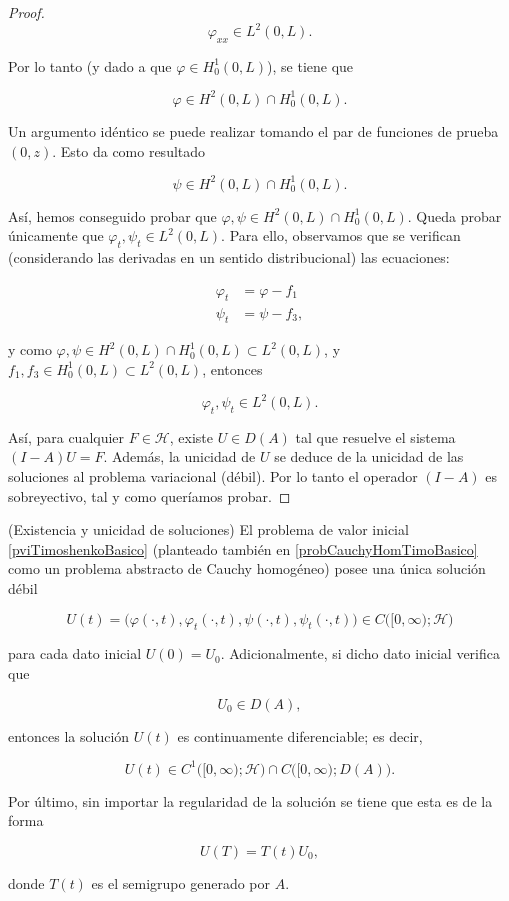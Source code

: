 \begin{proof}
    \[\varphi_{xx} \in L^2(0,L).\]

    Por lo tanto (y dado a que $\varphi \in H_0^1(0,L)$), se tiene que

    \[\varphi \in H^2(0,L) \cap H_0^1(0,L).\]

    Un argumento idéntico se puede realizar tomando el par de funciones de prueba $ (0,z)$. Esto da como resultado

    \[\psi \in H^2(0,L) \cap H_0^1(0,L).\]

    Así, hemos conseguido probar que $\varphi, \psi \in H^2(0,L) \cap H_0^1(0,L)$. Queda probar únicamente que $\varphi_t, \psi_t \in L^2(0,L)$. Para ello, observamos que se verifican (considerando las derivadas en un sentido distribucional) las ecuaciones:

    \begin{align*}
        \varphi_t &= \varphi - f_1\\
        \psi_t &= \psi - f_3,
    \end{align*}

    y como $\varphi, \psi \in H^2(0,L) \cap H_0^1(0,L) \subset L^2(0,L)$, y $f_1, f_3 \in H_0^1(0,L) \subset L^2(0,L)$, entonces

    \[\varphi_t, \psi_t \in L^2(0,L).\]

    Así, para cualquier $F \in \mathcal{H}$, existe $U \in D(A)$ tal que resuelve el sistema $(I-A)U = F$. Además, la unicidad de $U$ se deduce de la unicidad de las soluciones al problema variacional (débil). Por lo tanto el operador $(I-A)$ es sobreyectivo, tal y como queríamos probar.
\end{proof}

\begin{Teorema}{(Existencia y unicidad de soluciones)}
\label{ch:teoriaVigas:prop:existenciaYUnicidad}
    El problema de valor inicial \eqref{pviTimoshenkoBasico} (planteado también en \eqref{probCauchyHomTimoBasico} como un problema abstracto de Cauchy homogéneo) posee una única solución débil

    \[U(t) = \big(\varphi(\cdot, t), \varphi_t(\cdot, t), \psi(\cdot, t), \psi_t(\cdot, t)\big) \in C\big([0,\infty);\mathcal{H}\big)\]

    para cada dato inicial $U(0) = U_0$. Adicionalmente, si dicho dato inicial verifica que

    \[U_0 \in D(A),\]

    entonces la solución $U(t)$ es continuamente diferenciable; es decir,

    \todo[inline]{Añadir explicación sobre por qué $C^1\big([0,\infty);\mathcal{H}\big) \cap C\big([0,\infty) ; D(A)\big)$}
    \[U(t) \in C^1\big([0,\infty);\mathcal{H}\big) \cap C\big([0,\infty) ; D(A)\big).\]

    Por último, sin importar la regularidad de la solución se tiene que esta es de la forma

    \[U(T) = T(t)U_0,\]

    donde $T(t)$ es el semigrupo generado por $A$.
\end{Teorema}

